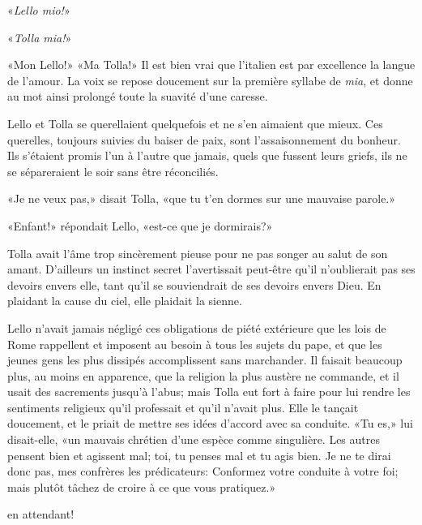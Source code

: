 «\emph{Lello mio!}»

«\emph{Tolla mia!}»

«Mon Lello!» «Ma Tolla!» Il est bien vrai que l'italien est par
excellence la langue de l'amour. La voix se repose doucement sur la
première syllabe de \emph{mia}, et donne au mot ainsi prolongé toute la
suavité d'une caresse.

Lello et Tolla se querellaient quelquefois et ne s'en aimaient que
mieux. Ces querelles, toujours suivies du baiser de paix, sont
l'assaisonnement du bonheur. Ils s'étaient promis l'un à l'autre que
jamais, quels que fussent leurs griefs, ils ne se sépareraient le soir
sans être réconciliés.

«Je ne veux pas,» disait Tolla, «que tu t'en dormes sur une mauvaise
parole.»

«Enfant!» répondait Lello, «est-ce que je dormirais?»

Tolla avait l'âme trop sincèrement pieuse pour ne pas songer au salut de
son amant. D'ailleurs un instinct secret l'avertissait peut-être qu'il
n'oublierait pas ses devoirs envers elle, tant qu'il se souviendrait de
ses devoirs envers Dieu. En plaidant la cause du ciel, elle plaidait la
sienne.

Lello n'avait jamais négligé ces obligations de piété extérieure que les
lois de Rome rappellent et imposent au besoin à tous les sujets du pape,
et que les jeunes gens les plus dissipés accomplissent sans marchander.
Il faisait beaucoup plus, au moins en apparence, que la religion la plus
austère ne commande, et il usait des sacrements jusqu'à l'abus; mais
Tolla eut fort à faire pour lui rendre les sentiments religieux qu'il
professait et qu'il n'avait plus. Elle le tançait doucement, et le
priait de mettre ses idées d'accord avec sa conduite. «Tu es,» lui
disait-elle, «un mauvais chrétien d'une espèce comme singulière. Les
autres pensent bien et agissent mal; toi, tu penses mal et tu agis bien.
Je ne te dirai donc pas, mes confrères les prédicateurs: Conformez votre
conduite à votre foi; mais plutôt tâchez de croire à ce que vous
pratiquez.»

en attendant!

